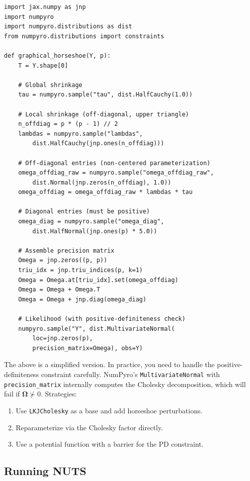 \documentclass[11pt,a4paper]{article}
\newcommand{\bOmega}{\bm{\Omega}}
\begin{document}
\begin{lstlisting}[caption={Graphical horseshoe model in NumPyro.}]
import jax.numpy as jnp
import numpyro
import numpyro.distributions as dist
from numpyro.distributions import constraints

def graphical_horseshoe(Y, p):
    T = Y.shape[0]

    # Global shrinkage
    tau = numpyro.sample("tau", dist.HalfCauchy(1.0))

    # Local shrinkage (off-diagonal, upper triangle)
    n_offdiag = p * (p - 1) // 2
    lambdas = numpyro.sample("lambdas",
        dist.HalfCauchy(jnp.ones(n_offdiag)))

    # Off-diagonal entries (non-centered parameterization)
    omega_offdiag_raw = numpyro.sample("omega_offdiag_raw",
        dist.Normal(jnp.zeros(n_offdiag), 1.0))
    omega_offdiag = omega_offdiag_raw * lambdas * tau

    # Diagonal entries (must be positive)
    omega_diag = numpyro.sample("omega_diag",
        dist.HalfNormal(jnp.ones(p) * 5.0))

    # Assemble precision matrix
    Omega = jnp.zeros((p, p))
    triu_idx = jnp.triu_indices(p, k=1)
    Omega = Omega.at[triu_idx].set(omega_offdiag)
    Omega = Omega + Omega.T
    Omega = Omega + jnp.diag(omega_diag)

    # Likelihood (with positive-definiteness check)
    numpyro.sample("Y", dist.MultivariateNormal(
        loc=jnp.zeros(p),
        precision_matrix=Omega), obs=Y)
\end{lstlisting}

\begin{warning}
The above is a simplified version. In practice, you need to handle the positive-definiteness constraint carefully. NumPyro's \texttt{MultivariateNormal} with \texttt{precision\_matrix} internally computes the Cholesky decomposition, which will fail if $\bOmega \not\succ 0$. Strategies:
\begin{enumerate}[nosep]
  \item Use \texttt{LKJCholesky} as a base and add horseshoe perturbations.
  \item Reparameterize via the Cholesky factor directly.
  \item Use a potential function with a barrier for the PD constraint.
\end{enumerate}
\end{warning}

\subsection{Running NUTS}
\end{document}
